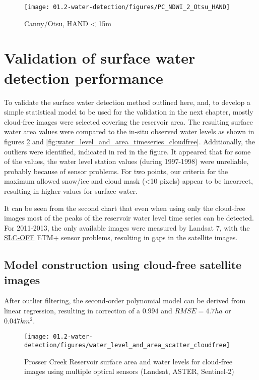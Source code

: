 \begin{figure}[H]
	\centering
	\texttt{[image: 01.2-water-detection/figures/PC\_NDWI\_2\_Otsu\_HAND]}
	\caption{Canny/Otsu, HAND < 15m}
	\label{fig:r1_canny_otsu_hand}
\end{figure}

\section{Validation of surface water detection performance}

To validate the surface water detection method outlined here, and, to develop a simple statistical model to be used for the validation in the next chapter, mostly cloud-free images were selected covering the reservoir area. The resulting surface water area values were compared to the in-situ observed water levels as shown in figures \ref{fig:scatter_fit} and \ref{fig:water_level_and_area_timeseries_cloudfree}. Additionally, the outliers were identified, indicated in red in the figure. It appeared that for some of the values, the water level station values (during 1997-1998) were unreliable, probably because of sensor problems. For two points, our criteria for the maximum allowed snow/ice and cloud mask (<10 pixels) appear to be incorrect, resulting in higher values for surface water.

It can be seen from the second chart that even when using only the cloud-free images most of the peaks of the reservoir water level time series can be detected. For 2011-2013, the only available images were measured by Landsat 7, with the \href{https://landsat.usgs.gov/slc-products-background}{SLC-OFF} ETM+ sensor problems, resulting in gaps in the satellite images.

\subsection{Model construction using cloud-free satellite images}

After outlier filtering, the second-order polynomial model can be derived from linear regression, resulting in correction of a $0.994$ and $RMSE = 4.7ha$ or $0.047km^2$.

\begin{figure}[H]
	\centering
	\texttt{[image: 01.2-water-detection/figures/water\_level\_and\_area\_scatter\_cloudfree]}
	\caption{Prosser Creek Reservoir surface area and water levels for cloud-free images using multiple optical sensors (Landsat, ASTER, Sentinel-2)}
	\label{fig:scatter_fit}
\end{figure}

